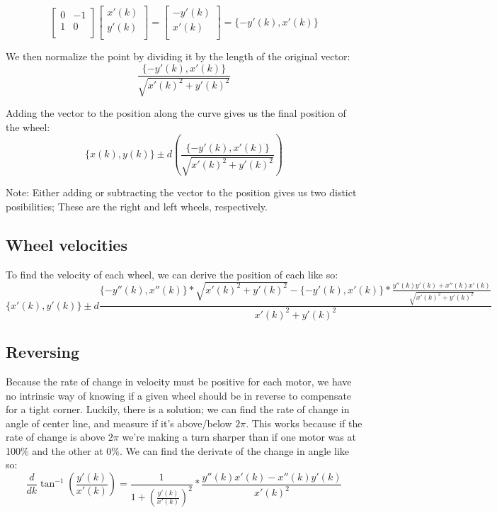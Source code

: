 \documentclass[12pt, english]{article}
\begin{document}
\[
	\begin{bmatrix}
		0 & -1 \\
		1 & 0 \\
	\end{bmatrix}
	\begin{bmatrix}
		x'(k)\\
		y'(k)\\
	\end{bmatrix}
	=
	\begin{bmatrix}
		-y'(k)\\
		x'(k)\\
	\end{bmatrix}
	= \{-y'(k), x'(k)\}
\]

\noindent
We then normalize the point by dividing it by the length of the original vector: \\
\[
	\label{deriv_speed_vec}
	\frac{\{-y'(k), x'(k)\}}{\sqrt{x'(k)^2+y'(k)^2}}
\]

\noindent
Adding the vector to the position along the curve gives us the final position of the wheel:
\[
	\{x(k), y(k)\} \pm d \left(\frac{\{-y'(k), x'(k)\}}{\sqrt{x'(k)^2+y'(k)^2}}\right)
\]

\noindent
Note: Either adding or subtracting  the vector to the position gives us two distict posibilities; These are the right and left wheels, respectively.

\subsection{Wheel velocities}
To find the velocity of each wheel, we can derive the position of each like so:
\[
	\{x'(k), y'(k)\} \pm d\frac{\{-y''(k), x''(k)\}*\sqrt{x'(k)^2+y'(k)^2} - \{-y'(k), x'(k)\} * \frac{y''(k)y'(k) + x''(k)x'(k)}{\sqrt{x'(k)^2+y'(k)^2}}}{x'(k)^2+y'(k)^2}
\]

\subsection{Reversing}
Because the rate of change in velocity must be positive for each motor, we have no intrinsic way of knowing if a given wheel should be in reverse to compensate for a tight corner. Luckily, there is a solution; we can find the rate of change in angle of center line, and measure if it's above/below $2\pi$. This works because if the rate of change is above $2\pi$ we're making a turn sharper than if one motor was at 100\% and the other at 0\%. We can find the derivate of the change in angle like so:
\[
	\label{change_in_angle}
	\frac{d}{dk} 
	\tan^{-1}{\left(\frac{y'(k)}{x'(k)}\right)} = 
	\frac{1}{1 + \left(\frac{y'(k)}{x'(k)}\right)^2} * \frac{y''(k)x'(k) - x''(k)y'(k)}{x'(k)^2}
\]
\end{document}
